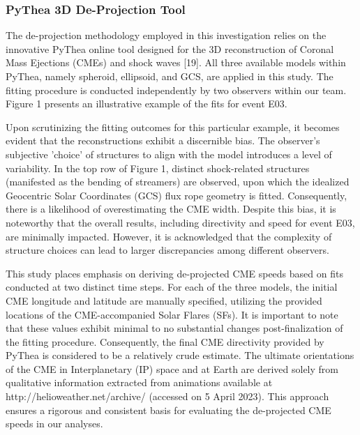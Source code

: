 \subsubsection{PyThea 3D De-Projection Tool}
The de-projection methodology employed in this investigation relies on the innovative PyThea online tool designed for the 3D reconstruction of Coronal Mass Ejections (CMEs) and shock waves [19]. All three available models within PyThea, namely spheroid, ellipsoid, and GCS, are applied in this study. The fitting procedure is conducted independently by two observers within our team. Figure 1 presents an illustrative example of the fits for event E03.

Upon scrutinizing the fitting outcomes for this particular example, it becomes evident that the reconstructions exhibit a discernible bias. The observer's subjective 'choice' of structures to align with the model introduces a level of variability. In the top row of Figure 1, distinct shock-related structures (manifested as the bending of streamers) are observed, upon which the idealized Geocentric Solar Coordinates (GCS) flux rope geometry is fitted. Consequently, there is a likelihood of overestimating the CME width. Despite this bias, it is noteworthy that the overall results, including directivity and speed for event E03, are minimally impacted. However, it is acknowledged that the complexity of structure choices can lead to larger discrepancies among different observers.

This study places emphasis on deriving de-projected CME speeds based on fits conducted at two distinct time steps. For each of the three models, the initial CME longitude and latitude are manually specified, utilizing the provided locations of the CME-accompanied Solar Flares (SFs). It is important to note that these values exhibit minimal to no substantial changes post-finalization of the fitting procedure. Consequently, the final CME directivity provided by PyThea is considered to be a relatively crude estimate. The ultimate orientations of the CME in Interplanetary (IP) space and at Earth are derived solely from qualitative information extracted from animations available at http://helioweather.net/archive/ (accessed on 5 April 2023). This approach ensures a rigorous and consistent basis for evaluating the de-projected CME speeds in our analyses.

















